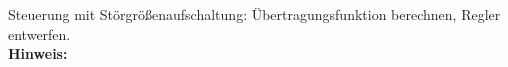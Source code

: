\begin{question}[section=4,name={Störgrößenaufschaltung},difficulty=,type=mdl,tags={}]
	Steuerung mit Störgrößenaufschaltung: Übertragungsfunktion berechnen, Regler entwerfen.
	\\ \textbf{Hinweis:}\\
	
\end{question}
\begin{solution}
	
\end{solution}